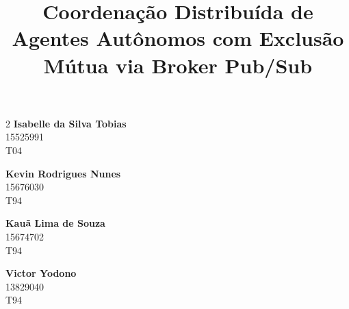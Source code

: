 \documentclass[a4paper]{article}
\title{
    \textbf{Coordena\c{c}\~ao Distribu\'ida de Agentes Aut\^onomos com Exclus\~ao M\'utua via Broker Pub/Sub}
}
\date{}
\begin{document}
\maketitle
\vspace{-1.5cm}
\thispagestyle{firstpage}

\begin{multicols}{2}
    \centering
    \textbf{Isabelle da Silva Tobias}\\
            15525991 \\
            T04

    \textbf{Kevin Rodrigues Nunes}\\
            15676030\\
            T94

    \columnbreak

    \textbf{Kau\~a Lima de Souza}\\
            15674702\\
            T94

    \textbf{Victor Yodono}\\
            13829040\\
            T94


\end{multicols}

\singlespacing
\setlength{\parskip}{6pt}
\setlength{\parindent}{0.5cm}
\end{document}
